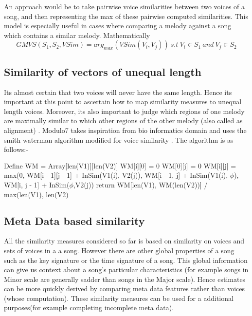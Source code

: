  An approach would be to take pairwise voice similarities between two voices of a song, and then representing the max of these pairwise computed similarities. This model is especially useful in cases where comparing a melody against a song which contains a similar melody. Mathematically 
\begin{equation}
GMVS(S_1, S_2, VSim) = arg_{max} (VSim(V_i, V_j)) \ s.t \ V_i \in S_1 \ and \ V_j \in S_2
\end{equation}

\subsection{Similarity of vectors of unequal length} \label{sim:unequal}

\noindent Its almost certain that two voices will never have the same length. Hence its important at this point to ascertain how to map similarity measures to unequal length voices. Moreover, its also important to judge which regions of one melody are maximally similar to which other regions of the other melody (also called as alignment) . Modulo7 takes inspiration from bio informatics domain and uses the smith waterman algorithm modified for voice similarity \cite{smithWatermanBook}. The algorithm is as follows:-

\begin{algorithm}

\label{CHalgorithm}
\begin{algorithmic}[1]
 {}
\State Define WM = Array[len(V1)][len(V2)]
\State WM[i][0] = 0
\EndFor
{}
\State WM[0][j] = 0
\EndFor
{}
\State WM[i][j] = max(0, WM[i - 1][j - 1] + InSim(V1(i), V2(j)), WM[i - 1, j] + InSim(V1(i), $\phi$), WM[i, j - 1] + InSim($\phi$,V2(j))
\EndFor
\EndFor
\State return WM[len(V1), WM(len(V2))] / max(len(V1), len(V2)
\EndProcedure
\end{algorithmic}
\end{algorithm}

\subsection{Meta Data based similarity}

\noindent All the similarity measures considered so far is based on similarity on voices and sets of voices in a a song. However there are other global properties of a song such as the key signature or the time signature of a song. This global information can give us context about a song's particular characteristics (for example songs in Minor scale are generally sadder than songs in the Major scale). Hence estimates can be more quickly derived by comparing meta data features rather than voices (whose computation). These similarity measures can be used for a additional purposes(for example completing incomplete meta data). 

